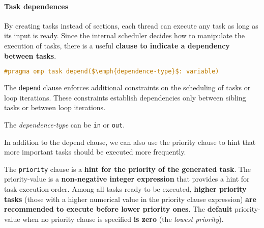 \paragraph{Task dependences}

By creating tasks instead of sections, each thread can execute any task as long as its input is ready. Since the internal scheduler decides how to manipulate the execution of tasks, there is a useful \textbf{clause to indicate a dependency between tasks}.
\begin{openmpbox}
    \begin{lstlisting}[language=C++, mathescape=true]
#pragma omp task depend($\emph{dependence-type}$: variable)\end{lstlisting}
    The \texttt{depend} clause enforces additional constraints on the scheduling of tasks or loop iterations. These constraints establish dependencies only between sibling tasks or between loop iterations.

    The \emph{dependence-type} can be \texttt{in} or \texttt{out}.
\end{openmpbox}

\noindent
In addition to the depend clause, we can also use the priority clause to hint that more important tasks should be executed more frequently.

\highspace
The \texttt{priority} clause is a \textbf{hint for the priority of the generated task}. The priority-value is a \textbf{non-negative integer expression} that provides a hint for task execution order. Among all tasks ready to be executed, \textbf{higher priority tasks} (those with a higher numerical value in the priority clause expression) \textbf{are recommended to execute before lower priority ones}. The \textbf{default} priority-value when no priority clause is specified \textbf{is zero} (the \emph{lowest priority}).

